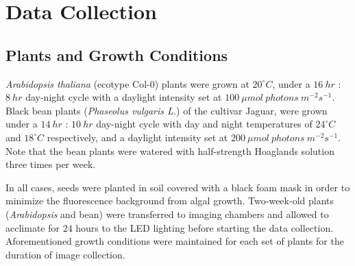 \section{Data Collection}
\label{sec:2}

\subsection{Plants and Growth Conditions}

{\it Arabidopsis thaliana} (ecotype Col-$0$) plants were grown at $20^{\circ}C$, under a $16~hr$ : $8~hr$ day-night cycle with a daylight intensity set at $100~\mu mol~photons~m^{-2} s^{-1}$.
%
Black bean plants ({\it Phaseolus vulgaris L.}) of the cultivar Jaguar, were grown under a $14~hr$ : $10~hr$ day-night cycle with day and night temperatures of $24^{\circ}C$ and $18^{\circ}C$ respectively, and a daylight intensity set at $200~\mu mol~photons~m^{-2} s^{-1}$.
%
Note that the bean plants were watered with half-strength Hoaglands solution three times per week.

In all cases, seeds were planted in soil covered with a black foam mask in order to minimize the fluorescence background from algal growth.
%
Two-week-old plants ({\it Arabidopsis} and bean) were transferred to imaging chambers and allowed to acclimate for $24$ hours to the LED lighting before starting the data collection.
Aforementioned growth conditions were maintained for each set of plants for the duration of image collection.

